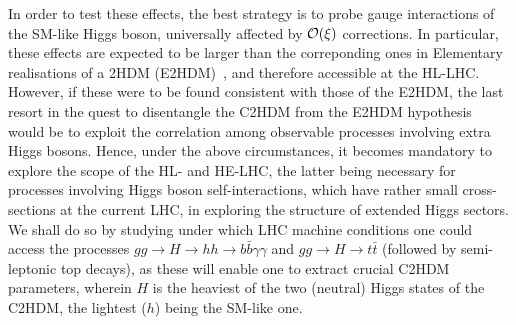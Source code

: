 In order to test these effects, the best strategy is to probe gauge interactions of the SM-like Higgs boson, universally affected by ${\cal O}(\xi)$ corrections. In particular, these effects are expected to be larger than the correponding ones in Elementary realisations of a 2HDM (E2HDM)~\cite{Branco:2011iw}, and therefore accessible at the HL-LHC.  
However, if these were to be found consistent with those of the E2HDM, the last resort in the quest to disentangle the C2HDM from the E2HDM hypothesis would be to exploit the correlation among observable processes involving extra Higgs bosons.
Hence, under the above circumstances, it becomes mandatory to explore the scope of the HL- and HE-LHC, the latter being  necessary for processes involving Higgs boson self-interactions, which have  rather small cross-sections  at the current LHC, in exploring the structure of extended Higgs sectors.
We shall do so by studying under which LHC machine conditions one could access the processes $gg \to H \to hh \to b\bar b\gamma\gamma$ and $gg \to H\to t\bar t$ (followed by semi-leptonic top decays), as these will enable one to extract crucial C2HDM parameters, wherein $H$ is the heaviest of the two \cpeven (neutral) Higgs states of the C2HDM, the lightest ($h$) being the SM-like one.  


